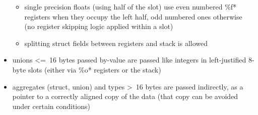 \begin{itemize}
\begin{itemize}
\item single precision floats (using half of the slot) use even numbered \%f* registers when they occupy the left half, odd numbered ones otherwise (no register skipping logic applied within a slot)
\item splitting struct fields between registers and stack is allowed
\end{itemize}
\item unions \textless=\ 16 bytes passed by-value are passed like integers in left-justified 8-byte slots (either via \%o* registers or the stack)
\item aggregates (struct, union) and types \textgreater\ 16 bytes are passed indirectly, as a pointer to a correctly aligned copy of the data (that copy can be avoided under certain conditions)
\end{itemize}

